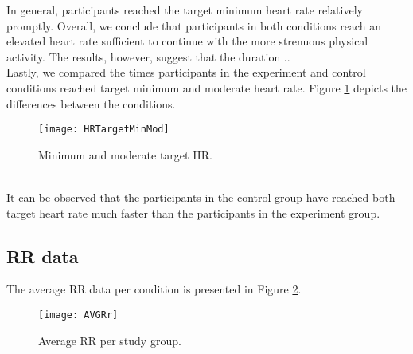 In general, participants reached the target minimum heart rate relatively promptly. 
Overall, we conclude that  participants in both conditions reach an elevated heart rate sufficient to continue with the more strenuous physical activity. The results, however, suggest that the duration .. \\
Lastly, we compared the times participants in the experiment and control conditions reached target minimum and moderate heart rate. Figure \ref{fig:hRTargetMinMod} depicts the differences between the conditions.\\ 
\begin{figure}[h]
    \centering
    \texttt{[image: HRTargetMinMod]}
    \caption{Minimum and moderate target HR.}
    \label{fig:hRTargetMinMod}
\end{figure}\\
It can be observed that the participants in the control group have reached both target heart rate much faster than the participants in the experiment group. 

\subsection{RR data}
The average RR data per condition is presented in Figure \ref{fig:rrdata}.
\begin{figure}[h]
    \centering
    \texttt{[image: AVGRr]}
    \caption{Average RR per study group.}
    \label{fig:rrdata}
\end{figure}\\
